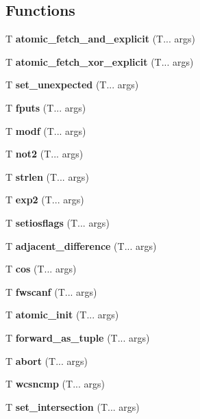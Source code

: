 \subsection*{Functions}
\begin{DoxyCompactItemize}
\item 
\mbox{\label{atomic_fetch_sub}} 
T \textbf{ atomic\+\_\+fetch\+\_\+and\+\_\+explicit} (T... args)
\item 
\mbox{\label{atomic_fetch_xor}} 
T \textbf{ atomic\+\_\+fetch\+\_\+xor\+\_\+explicit} (T... args)
\item 
\mbox{\label{set_unexpected}} 
T \textbf{ set\+\_\+unexpected} (T... args)
\item 
\mbox{\label{fputs}} 
T \textbf{ fputs} (T... args)
\item 
\mbox{\label{modf}} 
T \textbf{ modf} (T... args)
\item 
\mbox{\label{not2}} 
T \textbf{ not2} (T... args)
\item 
\mbox{\label{strlen}} 
T \textbf{ strlen} (T... args)
\item 
\mbox{\label{exp2}} 
T \textbf{ exp2} (T... args)
\item 
\mbox{\label{setiosflags}} 
T \textbf{ setiosflags} (T... args)
\item 
\mbox{\label{adjacent_difference}} 
T \textbf{ adjacent\+\_\+difference} (T... args)
\item 
\mbox{\label{cos}} 
T \textbf{ cos} (T... args)
\item 
\mbox{\label{fwscanf}} 
T \textbf{ fwscanf} (T... args)
\item 
\mbox{\label{atomic_init}} 
T \textbf{ atomic\+\_\+init} (T... args)
\item 
\mbox{\label{forward_as_tuple}} 
T \textbf{ forward\+\_\+as\+\_\+tuple} (T... args)
\item 
\mbox{\label{abort}} 
T \textbf{ abort} (T... args)
\item 
\mbox{\label{wcsncmp}} 
T \textbf{ wcsncmp} (T... args)
\item 
\mbox{\label{set_intersection}} 
T \textbf{ set\+\_\+intersection} (T... args)
\item 

\end{DoxyCompactItemize}
